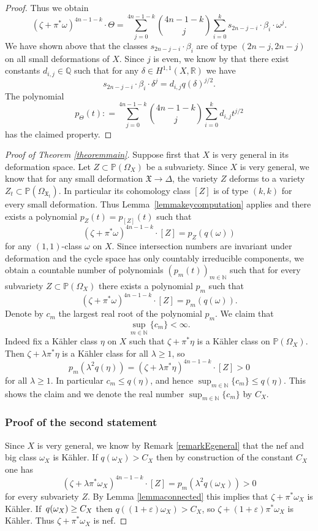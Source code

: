 \documentclass[JEP,XML,SOM,Unicode,NoEqCountersInSection,published]{cedram}
\theoremstyle{plain}
\theoremstyle{definition}
\newcommand{\R}{\ensuremath{\mathbb{R}}}
\newcommand{\Q}{\ensuremath{\mathbb{Q}}}
\newcommand{\N}{\ensuremath{\mathbb{N}}}
\newcommand{\PP}{\ensuremath{\mathbb{P}}}
\begin{document}
\begin{proof}
Thus we obtain
\[
(\zeta+\pi^*\omega)^{4n-1-k} \cdot \Theta
=
\sum_{j=0}^{4n-1-k}
\binom{4n-1-k}{j}
\sum_{i=0}^{k} s_{2n-j-i} \cdot \beta_{i} \cdot \omega^j
.
\]
We have shown above that the classes $s_{2n-j-i} \cdot \beta_{i}$
are of type $(2n-j, 2n-j)$ on all small deformations of $X$.
Since $j$ is even, we know by \cite[Th.\,5.12]{Huy97} that there exist
constants $d_{i,j} \in \Q$ such that for any
$\delta\in H^{1,1}(X,\R)$ we have
\[
s_{2n-j-i} \cdot \beta_{i} \cdot \delta^j = d_{i,j} q(\delta)^{j/2}.
\]
The polynomial
\[
p_\Theta(t): = \sum_{j=0}^{4n-1-k}
\binom{4n-1-k}{j}
\sum_{i=0}^{k} d_{i,j} t^{j/2}
\]
has the claimed property.
\end{proof}

\begin{proof}[Proof of Theorem \ref{theoremmain}]
Suppose first that $X$ is very general in its deformation space.
Let $Z \subset \PP(\Omega_X)$ be a subvariety.
Since $X$ is very general, we know that
for any small deformation $\mathfrak X \to \Delta$, the variety $Z$ deforms
to a variety $Z_t \subset \PP(\Omega_{\mathfrak X_t})$.
In particular its cohomology class $[Z]$ is of type $(k,k)$ for every small deformation.
Thus Lemma~\ref{lemmakeycomputation} applies and there exists a polynomial $p_Z(t)=p_{[Z]}(t)$ such that
\[
(\zeta + \pi^* \omega)^{4n-1-k} \cdot [Z] = p_Z(q(\omega))
\]
for any $(1,1)$-class $\omega$ on $X$. Since intersection numbers are invariant under deformation and the cycle space
has only countably irreducible components, we obtain a countable number of polynomials
$(p_m(t))_{m \in \N}$ such that for every subvariety $Z \subset \PP(\Omega_X)$ there exists a polynomial $p_m$
such that
\[
(\zeta + \pi^* \omega)^{4n-1-k} \cdot [Z] = p_m(q(\omega)).
\]
Denote by $c_m$ the largest real root of the polynomial $p_m$. We claim that
\[
\sup_{m \in \N} \{ c_m \} < \infty.
\]
Indeed fix a Kähler class $\eta$ on $X$ such that $\zeta+\pi^*\eta$ is a Kähler class on $\PP(\Omega_X)$. Then $\zeta+ \lambda \pi^*\eta$ is a Kähler class for all $\lambda \geq 1$, so
\[
p_m(\lambda^2 q(\eta)) = (\zeta + \lambda \pi^* \eta)^{4n-1-k} \cdot [Z] > 0
\]
for all $\lambda \geq 1$. In particular $c_m \leq q(\eta)$, and hence $\sup_{m \in \N} \{ c_m \} \leq q(\eta)$.
This shows the claim and we denote the real number $\sup_{m \in \N} \{ c_m \}$ by $C_X$.

\subsubsection*{Proof of the second statement}
Since $X$ is very general, we know by Remark \ref{remarkEgeneral} that the nef and big class $\omega_X$ is Kähler.
If $q(\omega_X) > C_X$ then by construction of the constant $C_X$ one has
\[
(\zeta + \lambda \pi^* \omega_X)^{4n-1-k} \cdot [Z] = p_m(\lambda^2 q(\omega_X)) > 0
\]
for every subvariety $Z$. By Lemma \ref{lemmaconnected} this implies that $\zeta+\pi^* \omega_X$ is Kähler.
If~$q(\omega_X) \geq\nobreak C_X$ then $q((1+\varepsilon) \omega_X) > C_X$, so $\zeta+(1+\varepsilon) \pi^* \omega_X$ is Kähler.
Thus $\zeta+\pi^* \omega_X$ is nef.


\end{proof}
\end{document}
